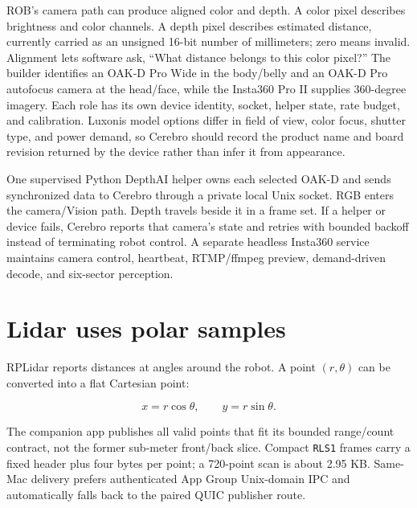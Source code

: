 \documentclass[11pt,openany]{book}
\begin{document}
ROB's camera path can produce aligned color and depth. A color pixel describes brightness and color channels. A depth pixel describes estimated distance, currently carried as an unsigned 16-bit number of millimeters; zero means invalid. Alignment lets software ask, ``What distance belongs to this color pixel?'' The builder identifies an OAK-D Pro Wide in the body/belly and an OAK-D Pro autofocus camera at the head/face, while the Insta360 Pro II supplies 360-degree imagery. Each role has its own device identity, socket, helper state, rate budget, and calibration. Luxonis model options differ in field of view, color focus, shutter type, and power demand, so Cerebro should record the product name and board revision returned by the device rather than infer it from appearance.

One supervised Python DepthAI helper owns each selected OAK-D and sends synchronized data to Cerebro through a private local Unix socket. RGB enters the camera/Vision path. Depth travels beside it in a frame set. If a helper or device fails, Cerebro reports that camera's state and retries with bounded backoff instead of terminating robot control. A separate headless Insta360 service maintains camera control, heartbeat, RTMP/ffmpeg preview, demand-driven decode, and six-sector perception.


\section*{Lidar uses polar samples}

RPLidar reports distances at angles around the robot. A point $(r,\theta)$ can be converted into a flat Cartesian point:

\[
x = r\cos\theta, \qquad y = r\sin\theta.
\]

The companion app publishes all valid points that fit its bounded range/count contract, not the former sub-meter front/back slice. Compact \texttt{RLS1} frames carry a fixed header plus four bytes per point; a 720-point scan is about 2.95 KB. Same-Mac delivery prefers authenticated App Group Unix-domain IPC and automatically falls back to the paired QUIC publisher route.
\end{document}
